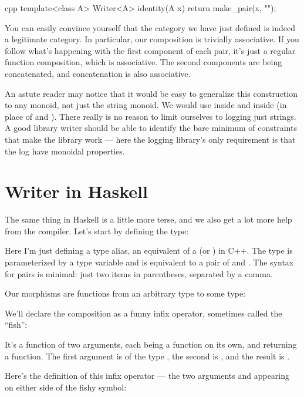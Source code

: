\begin{snip}{cpp}
template<class A> Writer<A> identity(A x) {
    return make_pair(x, "");
}
\end{snip}
You can easily convince yourself that the category we have just defined
is indeed a legitimate category. In particular, our composition is
trivially associative. If you follow what's happening with the first
component of each pair, it's just a regular function composition, which
is associative. The second components are being concatenated, and
concatenation is also associative.

An astute reader may notice that it would be easy to generalize this
construction to any monoid, not just the string monoid. We would use
 inside  and  inside
 (in place of \code{+} and ). There really
is no reason to limit ourselves to logging just strings. A good library
writer should be able to identify the bare minimum of constraints that
make the library work --- here the logging library's only requirement is
that the log have monoidal properties.

\section{Writer in Haskell}

The same thing in Haskell is a little more terse, and we also get a lot
more help from the compiler. Let's start by defining the 
type:

Here I'm just defining a type alias, an equivalent of a 
(or ) in C++. The type  is parameterized by
a type variable  and is equivalent to a pair of  and
. The syntax for pairs is minimal: just two items in
parentheses, separated by a comma.

Our morphisms are functions from an arbitrary type to some
 type:

We'll declare the composition as a funny infix operator, sometimes
called the ``fish'':

It's a function of two arguments, each being a function on its own, and
returning a function. The first argument is of the type
, the second is
, and the result is
.

Here's the definition of this infix operator --- the two arguments
 and  appearing on either side of the fishy
symbol:

